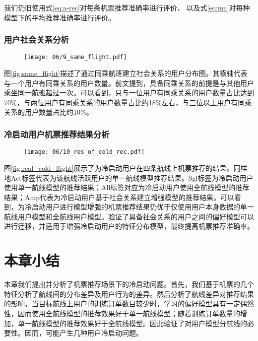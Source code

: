 我们仍旧使用式\ref{eq:a-rec}对每条机票推荐准确率进行评价，
以及式\ref{eq:ma}对每种模型下的平均推荐准确率进行评价。

\subsubsection{用户社会关系分析}

\begin{figure}
 \centering
 \texttt{[image: 06/9\_same\_flight.pdf]}
\end{figure}

图\ref{fig:same_flight}描述了通过同乘航班建立社会关系的用户分布图。其横轴代表与一个用户有同乘关系的用户数量。前文提到，具备同乘关系的前提是与其他用户乘坐同一航班超过一次。可以看到，只与一位用户有同乘关系的用户数量占比达到70\%，与两位用户有同乘关系的用户数量占比约18\%左右，与三位以上用户有同乘关系的用户数量占比约10\%。

\subsubsection{冷启动用户机票推荐结果分析}

\begin{figure}
 \centering
 \texttt{[image: 06/10\_res\_of\_cold\_rec.pdf]}
\end{figure}

图\ref{fig:real_cold_flight}展示了为冷启动用户在四条航线上机票推荐的结果。同样地Act标签代表为该航线活跃用户的单一航线模型推荐结果。Sgl标签为冷启动用户使用单一航线模型的推荐结果；All标签对应为冷启动用户使用全航线模型的推荐结果；Amp代表为冷启动用户基于社会关系建立增强模型的推荐结果。可以看到，为冷启动用户进行模型增强的机票推荐结果仍优于仅使用用户本身数据的单一航线用户模型和全航线用户模型。验证了具备社会关系的用户之间的偏好模型可以进行迁移，并适用于增强冷启动用户的特征分布模型，最终提高机票推荐准确率。


\section{本章小结}
本章我们提出并分析了机票推荐场景下的冷启动问题。首先，我们基于机票的几个特征分析了航线间的分布差异及用户行为的差异。然后分析了航线差异对推荐结果的影响，当目标航线上用户的训练订单数目较少时，学习的偏好模型具有一定偶然性，因而使用全航线模型的推荐效果好于单一航线模型；随着训练订单数量的增加，单一航线模型的推荐效果好于全航线模型。因此验证了对用户模型分航线的必要性。因而，可能产生几种用户冷启动问题。

